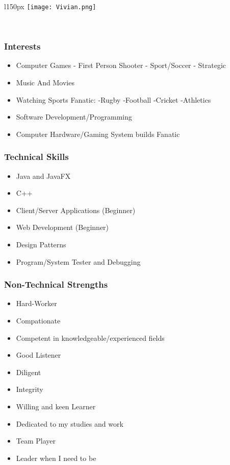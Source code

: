 \begin{wrapfigure}[7]{l}{150px}
\vspace{10pt}
\texttt{[image: Vivian.png]}
\end{wrapfigure}

\textcolor{white}{.}
\subsubsection{Interests}
\begin{itemize}
	\item{Computer Games}
		\subitem- First Person Shooter
		\subitem- Sport/Soccer
		\subitem- Strategic
	\item{Music And Movies}
	\item{Watching Sports Fanatic: }
		\subitem -Rugby 
		\subitem -Football
		\subitem -Cricket
		\subitem -Athletics
	\item{Software Development/Programming}
	\item{Computer Hardware/Gaming System builds Fanatic }
\end{itemize}
\subsubsection{Technical Skills}
\begin{itemize}
	\item{Java and JavaFX}
	\item{C++}
	\item{Client/Server Applications (Beginner)}
	\item{Web Development (Beginner)}
	\item{Design Patterns}
	\item{Program/System Tester and Debugging}
\end{itemize}

\subsubsection{Non-Technical Strengths}
\begin{itemize}
	\item{Hard-Worker}
	\item{Compationate}
	\item{Competent in knowledgeable/experienced fields}
	\item{Good Listener}
	\item{Diligent}
	\item{Integrity}
	\item{Willing and keen Learner}
	\item{Dedicated to my studies and work}
	\item{Team Player}
	\item{Leader when I need to be}
\end{itemize}